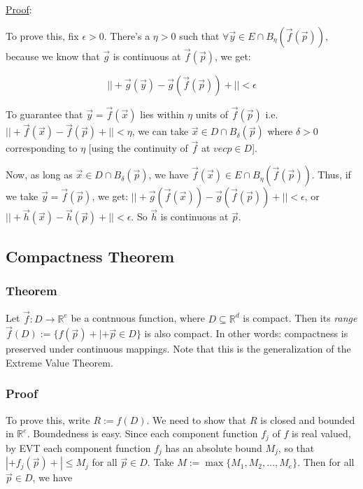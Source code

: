 \documentclass[11 pt, twoside]{article}
\begin{document}
\underline{Proof}:

To prove this, fix $\epsilon > 0$. There's a $\eta > 0$ such that
$\forall \vec{y} \in E \cap B_\eta(\vec{f}(\vec{p}))$, because we know that
$\vec{g}$ is continuous at $\vec{f}(\vec{p})$, we get:

$$||+\vec{g}(\vec{y}) - \vec{g}(\vec{f}(\vec{p}))+|| < \epsilon$$

To guarantee that $\vec{y} = \vec{f}(\vec{x})$ lies within $\eta$ units of
$\vec{f}(\vec{p})$ i.e. $||+\vec{f}(\vec{x}) - \vec{f}(\vec{p})+|| < \eta$, we
can take $\vec{x} \in D \cap B_\delta(\vec{p})$ where $\delta > 0$ corresponding
to $\eta$ [using the continuity of $\vec{f}$ at $vec{p} \in D$].

Now, as long as $\vec{x} \in D \cap B_\delta(\vec{p})$, we have
$\vec{f}(\vec{x}) \in E \cap B_\eta(\vec{f}(\vec{p}))$. Thus, if we take
$\vec{y} = \vec{f}(\vec{p})$, we get: $||+\vec{g}(\vec{f}(\vec{x})) -
\vec{g}(\vec{f}(\vec{p}))+|| < \epsilon$, or $||+\vec{h}(\vec{x}) -
\vec{h}(\vec{p})+|| < \epsilon$. So $\vec{h}$ is continuous at $\vec{p}$.

\subsection{Compactness Theorem}

\subsubsection{Theorem}

Let $\vec{f} : D \to \mathbb{R}^e$ be a contnuous function, where $D \subseteq
\mathbb{R}^d$ is compact. Then its \textit{range} $\vec{f}(D) := \{f(\vec{p}) +|+
\vec{p} \in D\}$ is also compact. In other words: compactness is preserved under
continuous mappings. Note that this is the generalization of the Extreme Value
Theorem.

\subsubsection{Proof}

To prove this, write $R := f(D)$. We need to show that $R$ is closed and bounded
in $\mathbb{R}^e$. Boundedness is easy. Since each component function $f_j$
of $f$ is real valued, by EVT each component function $f_j$ has an absolute
bound $M_j$, so that $|+f_j(\vec{p})+| \leq M_j$ for all $\vec{p} \in D$. 
Take $M := \max\{M_1, M_2, \dots, M_e\}$. Then for all $\vec{p} \in D$, we have
\end{document}

